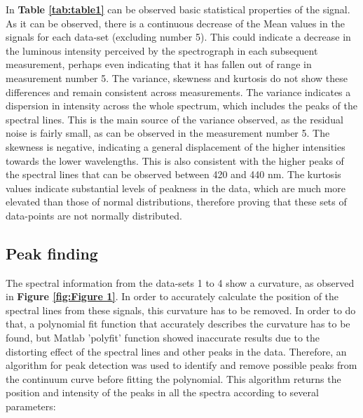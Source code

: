 In \textbf{Table \ref{tab:table1}} can be observed basic statistical properties of the signal. As it can be observed, there is a continuous decrease of the Mean values in the signals for each data-set (excluding number 5). This could indicate a decrease in the luminous intensity perceived by the spectrograph in each subsequent measurement, perhaps even indicating that it has fallen out of range in measurement number 5. The variance, skewness and kurtosis do not show these differences and remain consistent across measurements. The variance indicates a dispersion in intensity across the whole spectrum, which includes the peaks of the spectral lines. This is the main source of the variance observed, as the residual noise is fairly small, as can be observed in the measurement number 5. The skewness is negative, indicating a general displacement of the higher intensities towards the lower wavelengths. This is also consistent with the higher peaks of the spectral lines that can be observed between 420 and 440 nm. The kurtosis values indicate substantial levels of peakness in the data, which are much more elevated than those of normal distributions, therefore proving that these sets of data-points are not normally distributed.

\subsection{Peak finding}
The spectral information from the data-sets 1 to 4 show a curvature, as observed in\textbf{ Figure \ref{fig:Figure 1}}. In order to accurately calculate the position of the spectral lines from these signals, this curvature has to be removed. In order to do that, a polynomial fit function that accurately describes the curvature has to be found, but Matlab 'polyfit' function showed inaccurate results due to the distorting effect of the spectral lines and other peaks in the data. Therefore, an algorithm for peak detection was used to identify and remove possible peaks from the continuum curve before fitting the polynomial. This algorithm returns the position and intensity of the peaks in all the spectra according to several parameters:

